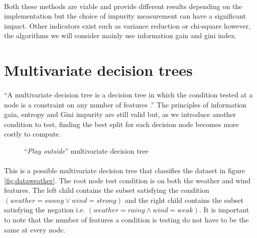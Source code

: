 \documentclass[12pt]{report}
\theoremstyle{definition}
\theoremstyle{definition}
\theoremstyle{definition}
\begin{document}
\paragraph{} Both these methods are viable and provide different results depending on the implementation but
the choice of impurity measurement can have a significant impact. Other indicators exist such as variance 
reduction or chi-square however, the algorithms we will consider mainly use information gain and gini index.

\section{Multivariate decision trees}
\paragraph{} ``A multivariate decision tree is a decision tree in which the condition tested at a node is a constraint on
any number of features \cite{multivariate-explaining}.'' The principles of information gain, entropy and Gini
impurity are still valid but, as we introduce another condition to test, finding the best split for each
decision node becomes more costly to compute.

\begin{figure}[h]
    \centering
    \caption{``\textit{Play outside}'' multivariate decision tree}
    \label{fig:multitree}
\end{figure}

\paragraph{} This is a possible multivariate decision tree that classifies the dataset in figure \ref{fig:dataweather}.
The root node test condition is on both the weather and wind features. The left child contains the subset
satisfying the condition $(weather=sunny \lor wind=strong)$ and the right child contains the subset satisfying
the negation i.e. $(weather=rainy \land wind=weak)$. It is important to note that the number of features a
condition is testing do not have to be the same at every node.
\end{document}

